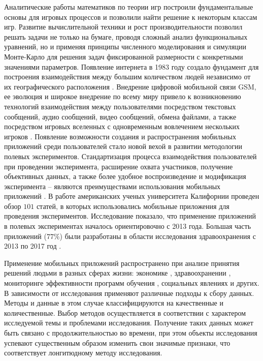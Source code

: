Аналитические работы математиков по теории игр построили фундаментальные основы для игровых процессов и позволили найти решение к некоторым классам игр. Развитие вычислительной техники и рост производительности позволил решать задачи не только на бумаге, проводя сложный анализ функциональных уравнений, но и применяя принципы численного моделирования и симуляции Монте-Карло \cite{Sobol_monte-carlo_1968} для решения задач фиксированной размерности с конкретными значениями параметров. Появление интернета в 1983 году создало фундамент для построения взаимодействия между большим количеством людей независимо от их географического расположения \cite{Barbruk_internet_2015}. Внедрение цифровой мобильной связи GSM, ее эволюция и широкое внедрение по всему миру привело к возникновению технологий взаимодействия между пользователями посредством текстовых сообщений, аудио сообщений, видео сообщений, обмена файлами, а также посредством игровых вселенных с одновременным вовлечением нескольких игроков \cite{teslenko_cell_network_2018}. Появление возможности создания и распространения мобильных приложений среди пользователей стало новой вехой в развитии методологии полевых экспериментов. Стандартизация процесса взаимодействия пользователей при проведении эксперимента, расширение охвата участников, получение объективных данных, а также более удобное воспроизведение и модификация эксперимента -- являются преимуществами использования мобильных приложений 
\cite{zhang_advantages_2018}. В работе американских ученых университета Калифорнии проведен обзор $101$ статей, в которых использовались мобильные приложения для проведения экспериментов.
Исследование показало, что применение приложений в полевых экспериментах началось ориентировочно с 2013 года. Большая часть приложений ($77\%$) были разработаны в области исследования здравоохранения с 2013 по 2017 год \cite{zhang_advantages_2018}.

Применение мобильных приложений распространено при анализе принятия решений людьми в разных сферах жизни: 
экономике \cite{li_conducting_2021}, здравоохранении \cite{zhang_efficacy_2015, serkh_optimal_2014},
мониторинге эффективности программ обучения \cite{menon_application_2021}, социальных явлениях \cite{chataway_geography_2017} и других. В зависимости от исследования применяют различные подходы к сбору данных. Методы и данные в этом случае классифицируются на качественные и количественные. Выбор методов осуществляется в соответствии с характером исследуемой темы и проблемами исследования. Получение таких данных может быть связано с продолжительностью во времени, при этом объекты исследования успевают существенным образом изменить свои значимые признаки, что соответствует лонгитюдному методу исследования. 

